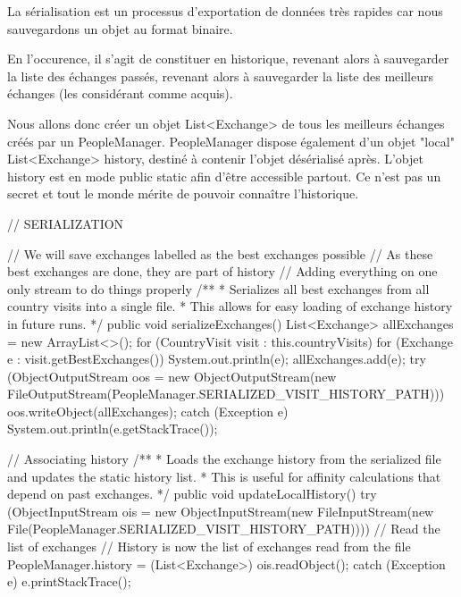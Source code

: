 \documentclass{mytex}
\begin{document}

La sérialisation est un processus d'exportation de données très rapides car nous sauvegardons un objet au format binaire.

En l'occurence, il s'agit de constituer en historique, revenant alors à sauvegarder la liste des échanges passés, revenant alors à sauvegarder la liste des meilleurs échanges (les considérant comme acquis).

Nous allons donc créer un objet List<Exchange> de tous les meilleurs échanges créés par un PeopleManager.
PeopleManager dispose également d'un objet "local" List<Exchange> history, destiné à contenir l'objet désérialisé après. L'objet history est en mode public static afin d'être accessible partout. Ce n'est pas un secret et tout le monde mérite de pouvoir connaître l'historique.

\begin{codebox}
// SERIALIZATION 

// We will save exchanges labelled as the best exchanges possible
// As these best exchanges are done, they are part of history
// Adding everything on one only stream to do things properly
/**
* Serializes all best exchanges from all country visits into a single file.
* This allows for easy loading of exchange history in future runs.
*/
public void serializeExchanges() {
	List<Exchange> allExchanges = new ArrayList<>();
	for (CountryVisit visit : this.countryVisits) {
		for (Exchange e : visit.getBestExchanges()) {
			System.out.println(e);
			allExchanges.add(e);
		}
	}
	try (ObjectOutputStream oos = new ObjectOutputStream(new FileOutputStream(PeopleManager.SERIALIZED_VISIT_HISTORY_PATH))) {
		oos.writeObject(allExchanges);
	} catch (Exception e) {
		System.out.println(e.getStackTrace());
	}
}

// Associating history  
/**
* Loads the exchange history from the serialized file and updates the static history list.
* This is useful for affinity calculations that depend on past exchanges.
*/
public void updateLocalHistory() {
	try (ObjectInputStream ois = new ObjectInputStream(new FileInputStream(new File(PeopleManager.SERIALIZED_VISIT_HISTORY_PATH)))) {
		// Read the list of exchanges
		// History is now the list of exchanges read from the file
		PeopleManager.history = (List<Exchange>) ois.readObject();
	} catch (Exception e) {
		e.printStackTrace();
	}
}
\end{codebox}

\end{document}

